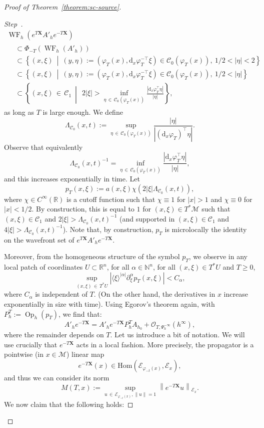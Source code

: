 \documentclass[10pt]{amsart}
\theoremstyle{definition}\newtheorem{defi}[theo]{Definition}\newtheorem{rema}[theo]{Remark}\newtheorem{exam}[theo]{Example}\newtheorem{exem}[theo]{Example}\newtheorem{nota}[theo]{Notation}
\newcommand{\R}{\mathbb{R}}
\newcommand{\N}{\mathbb{N}}
\newcommand{\X}{\mathbf{X}}
\newcommand{\mc}{\mathcal}
\newcommand{\M}{\mathcal{M}}
\newcommand{\E}{\mathcal{E}}
\newcommand{\clC}{\mathcal{C}}
\newcommand{\dd}{\mathrm{d}}
\newcommand{\Hom}{\mathrm{Hom}}
\DeclareMathOperator{\Op}{Op}
\DeclareMathOperator{\WF}{WF}
\newcounter{stepcount}
\newenvironment{step}{\refstepcounter{stepcount}\begin{proof}[Step~\thestepcount]}{\let\qed\relax\end{proof}}
\begin{document}
\begin{proof}[Proof of Theorem~\ref{theorem:sc-source}]
\begin{step}
\begin{multline*}
\WF_h\left(e^{T\X} A'_h e^{-T\X}\right)\\
\begin{aligned}
&\subset \Phi_{-T}\left(\WF_h(A'_h)\right)\\
&\subset \left\{(x,\xi)\ \middle|\ (y,\eta):=\left(\varphi_T(x), \dd _x\varphi_T^{-\top}\xi\right) \in \clC_0(\varphi_T(x)),\ 1/2 < |\eta| < 2 \right\} \\
&\subset \left\{(x,\xi)\ \middle|\ (y,\eta):=\left(\varphi_T(x), \dd _x\varphi_T^{-\top}\xi\right) \in \clC_0(\varphi_T(x)),\ 1/2 < |\eta| \right\} \\
&\subset \left\{(x,\xi)\,\in\,\clC_1~\middle|~\ 2|\xi| > \inf_{\eta\,\in\,\clC_0(\varphi_T(x))} \frac{\left|\dd_x\varphi_T^{\top}\eta\right|}{|\eta|} \right\},
\end{aligned}
\end{multline*}
as long as $T$ is large enough. We define
\[
\Lambda_{\clC_0}(x,t) := \sup_{\eta\,\in\,\clC_0(\varphi_T(x))} \frac{|\eta|}{\left|(\dd_x \varphi_T)^{\top} \eta\right|}.
\]
Observe that equivalently
\[
\Lambda_{\clC_0}(x,t)^{-1}= \inf_{\eta\,\in \,\clC_0(\varphi_T(x))} \frac{\left|\dd_x\varphi_T^{\top}\eta\right|}{|\eta|},
\]
and this increases exponentially in time. Let
\[
p_T(x,\xi) := a(x,\xi)\chi\left(2|\xi| \Lambda_{\clC_0}(x,t)\right),
\]
where $\chi \in C^\infty(\R)$ is a cutoff function such that $\chi \equiv 1$ for $|x| > 1$ and $\chi \equiv 0$ for $|x| < 1/2$. By construction, this is equal to $1$ for $(x,\xi) \in T^*\M$ such that $(x,\xi) \in \clC_1$ and $2 |\xi|> \Lambda_{\clC_0}(x,t)^{-1}$ (and supported in $(x,\xi) \in \clC_1$ and $4 |\xi|> \Lambda_{\clC_0}(x,t)^{-1}$). Note that, by construction, $p_T$ is microlocally the identity on the wavefront set of $e^{T\X} A'_h e^{-T\X}$.

Moreover, from the homogeneous structure of the symbol $p_T$, we observe in any local patch of coordinates $U \subset \R^n$, for all $\alpha\in \N^n$, for all $(x,\xi) \in T^*U$ and $T \geq 0$,
\[
\sup_{(x,\xi)\,\in\,T^*U} \left|\langle\xi\rangle^{|\alpha|} \partial_\xi^\alpha p_T(x,\xi)\right| < C_\alpha,
\]
where $C_\alpha$ is independent of $T$. (On the other hand, the derivatives in $x$ increase exponentially in size with time). Using Egorov's theorem again, with $P_h^T := \Op_h(p_T)$, we find that:
\begin{equation}\label{equation:this-is-life}
A'_h e^{-T \X} = A'_h e^{-T \X} P_h^T A_{h_0} + \mc{O}_{T, \Psi^{-\infty}_h}(h^\infty),
\end{equation}
where the remainder depends on $T$. Let us introduce a bit of notation. We will use crucially that $e^{-T\X}$ acts in a local fashion. More precisely, the propagator is a pointwise (in $x \in \M$) linear map
\[
e^{-T \X}(x)\in \Hom\left(\E_{\varphi_{-t}(x)}, \E_x\right),
\]
and thus we can consider its norm
\[
M(T,x) := \sup_{u\,\in\,\E_{\varphi_{-t}(x)}, \|u\|=1} \left\|e^{-T \X}u\right\|_{\E_x}.
\]
We now claim that the following holds:


\end{step}
\end{proof}
\end{document}
